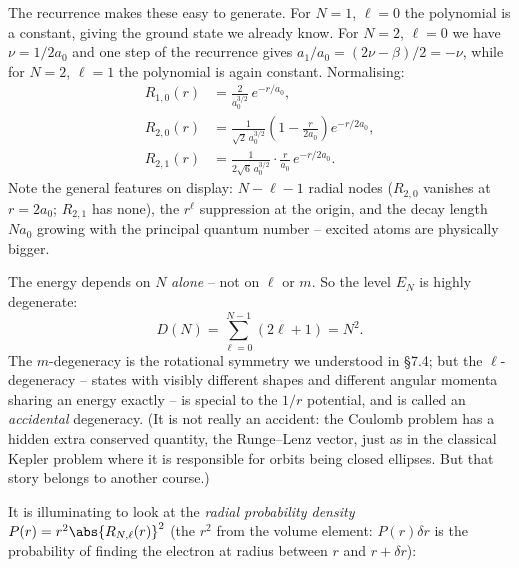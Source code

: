 \begin{example}
    The recurrence makes these easy to generate. For $N = 1$, $\ell = 0$ the polynomial is a constant, giving the ground state we already know. For $N = 2$, $\ell = 0$ we have $\nu = 1/2a_0$ and one step of the recurrence gives $a_1 / a_0 = (2\nu - \beta)/2 = -\nu$, while for $N = 2$, $\ell = 1$ the polynomial is again constant. Normalising:
    \begin{align*}
        R_{1,0}(r) &= \frac{2}{a_0^{3/2}} \, e^{-r/a_0}, \\
        R_{2,0}(r) &= \frac{1}{\sqrt{2} \, a_0^{3/2}} \left( 1 - \frac{r}{2 a_0} \right) e^{-r/2a_0}, \\
        R_{2,1}(r) &= \frac{1}{2\sqrt{6} \, a_0^{3/2}} \cdot \frac{r}{a_0} \, e^{-r/2a_0}.
    \end{align*}
    Note the general features on display: $N - \ell - 1$ radial nodes ($R_{2,0}$ vanishes at $r = 2a_0$; $R_{2,1}$ has none), the $r^\ell$ suppression at the origin, and the decay length $N a_0$ growing with the principal quantum number -- excited atoms are physically bigger.
\end{example}

The energy depends on $N$ \emph{alone} -- not on $\ell$ or $m$. So the level $E_N$ is highly degenerate:
$$
D(N) = \sum_{\ell = 0}^{N-1} (2 \ell + 1) = N^2.
$$
The $m$-degeneracy is the rotational symmetry we understood in \S 7.4; but the $\ell$-degeneracy -- states with visibly different shapes and different angular momenta sharing an energy exactly -- is special to the $1/r$ potential, and is called an \emph{accidental} degeneracy. (It is not really an accident: the Coulomb problem has a hidden extra conserved quantity, the Runge--Lenz vector, just as in the classical Kepler problem where it is responsible for orbits being closed ellipses. But that story belongs to another course.)

It is illuminating to look at the \emph{radial probability density} $P(r) = r^2 \abs{R_{N,\ell}(r)}^2$ (the $r^2$ from the volume element: $P(r) \delta r$ is the probability of finding the electron at radius between $r$ and $r + \delta r$):

